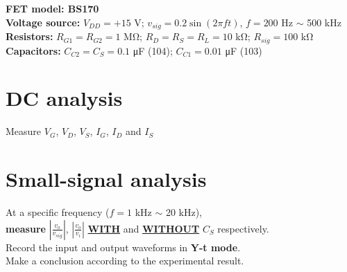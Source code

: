 \documentclass{article}
\begin{document}
\begin{CJK*}{UTF8}{bkai}
\textbf{FET model: BS170}\\
\textbf{Voltage source:} $V_{DD} = +15$ \unit{\volt}; $v_{sig} = 0.2 \sin(2 \pi f t)$, $f = 200$ \unit{\hertz} $\sim$ 500 \unit{\kilo\hertz}\\
\textbf{Resistors: }$R_{G1} = R_{G2} = 1$ \unit{\mega\ohm}; $R_D = R_S = R_L = 10$ \unit{\kilo\ohm}; $R_{sig} = 100$ \unit{\kilo\ohm}\\
\textbf{Capacitors: }$C_{C2} = C_S = 0.1$ \unit{\micro\farad} (104); $C_{C1} = 0.01$ \unit{\micro\farad} (103)\\

\section*{DC analysis}
Measure $V_G$, $V_D$, $V_S$, $I_G$, $I_D$ and $I_S$

\section*{Small-signal analysis}
At a specific frequency ($f = 1$ \unit{\kilo\hertz} $\sim$ 20 \unit{\kilo\hertz}),\\
\textbf{measure} $\displaystyle{\left\lvert \frac{v_o}{v_{sig}}\right\rvert}$, $\displaystyle{\left\lvert \frac{v_o}{v_i}\right\rvert}$ \textbf{\underline{WITH}} and \textbf{\underline{WITHOUT}} $C_S$ respectively.\\
Record the input and output waveforms in \textbf{Y-t mode}.\vspace{2mm}\\
Make a conclusion according to the experimental result.


\end{CJK*}
\end{document}
